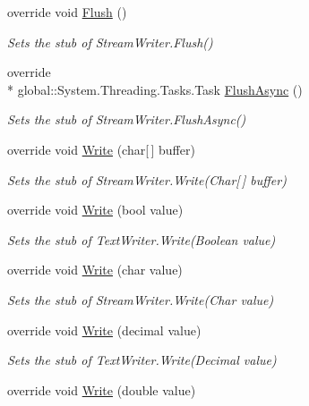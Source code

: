 \begin{DoxyCompactItemize}
override void \hyperlink{class_system_1_1_i_o_1_1_fakes_1_1_stub_stream_writer_a32a90e9496af0eac31782b9230b5b5ec}{Flush} ()
\begin{DoxyCompactList}\small\item\em Sets the stub of Stream\-Writer.\-Flush()\end{DoxyCompactList}\item 
override \\*
global\-::\-System.\-Threading.\-Tasks.\-Task \hyperlink{class_system_1_1_i_o_1_1_fakes_1_1_stub_stream_writer_a6cbf6b83e607a9b0fa40afe381514555}{Flush\-Async} ()
\begin{DoxyCompactList}\small\item\em Sets the stub of Stream\-Writer.\-Flush\-Async()\end{DoxyCompactList}\item 
override void \hyperlink{class_system_1_1_i_o_1_1_fakes_1_1_stub_stream_writer_a4235f1455caad3d66ef26c6303fae0ad}{Write} (char\mbox{[}$\,$\mbox{]} buffer)
\begin{DoxyCompactList}\small\item\em Sets the stub of Stream\-Writer.\-Write(\-Char\mbox{[}$\,$\mbox{]} buffer)\end{DoxyCompactList}\item 
override void \hyperlink{class_system_1_1_i_o_1_1_fakes_1_1_stub_stream_writer_a9205bc56012bf1d91bee6c820c431fc7}{Write} (bool value)
\begin{DoxyCompactList}\small\item\em Sets the stub of Text\-Writer.\-Write(\-Boolean value)\end{DoxyCompactList}\item 
override void \hyperlink{class_system_1_1_i_o_1_1_fakes_1_1_stub_stream_writer_aafc9080fde950a97460fe22fddc614cd}{Write} (char value)
\begin{DoxyCompactList}\small\item\em Sets the stub of Stream\-Writer.\-Write(\-Char value)\end{DoxyCompactList}\item 
override void \hyperlink{class_system_1_1_i_o_1_1_fakes_1_1_stub_stream_writer_a80d625d9785fa1ed6172678ab8d92afe}{Write} (decimal value)
\begin{DoxyCompactList}\small\item\em Sets the stub of Text\-Writer.\-Write(\-Decimal value)\end{DoxyCompactList}\item 
override void \hyperlink{class_system_1_1_i_o_1_1_fakes_1_1_stub_stream_writer_ad68efa59aa2d035811fbbd89193c1af5}{Write} (double value)

\end{DoxyCompactItemize}
